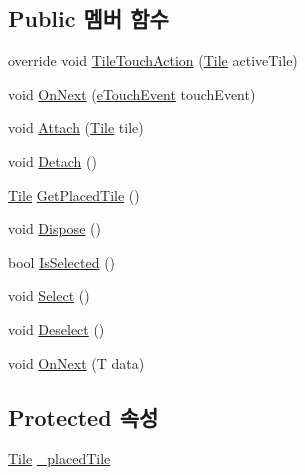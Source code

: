 \subsection*{Public 멤버 함수}
\begin{DoxyCompactItemize}
\item 
override void \hyperlink{class_moveable_object_a8aa14fd4e56b9911e895f5e899e0d9a0}{Tile\+Touch\+Action} (\hyperlink{class_tile}{Tile} active\+Tile)
\item 
void \hyperlink{class_moveable_object_aeba5445de84542260b21e15e1308f712}{On\+Next} (\hyperlink{_touch_manager_8cs_ae33e321a424fe84ba8b2fdb81ad40a68}{e\+Touch\+Event} touch\+Event)
\item 
void \hyperlink{class_placeable_object_a3176ec3d5d26b2a83cdc58b01e630aa1}{Attach} (\hyperlink{class_tile}{Tile} tile)
\item 
void \hyperlink{class_placeable_object_aef2018b58bf7c8c0fab5aaf3d9a154d4}{Detach} ()
\item 
\hyperlink{class_tile}{Tile} \hyperlink{class_placeable_object_ab44a9b122632ac3cf0babb5040e8a201}{Get\+Placed\+Tile} ()
\item 
void \hyperlink{class_placeable_object_a8bd49b7db556556502a0518fc833be48}{Dispose} ()
\item 
bool \hyperlink{class_placeable_object_a71fd42914caa0dc6229fe6a5ffe09b99}{Is\+Selected} ()
\item 
void \hyperlink{class_placeable_object_a019818f3f6c6eb715fed163efa921f5a}{Select} ()
\item 
void \hyperlink{class_placeable_object_a0c1248b1f9981ddbf68e6f70a6498f3d}{Deselect} ()
\item 
void \hyperlink{interface_m_c_n_1_1_i_observer_a2f934b71aa4ddf6f936670d32c3cdff7}{On\+Next} (T data)
\end{DoxyCompactItemize}
\subsection*{Protected 속성}
\begin{DoxyCompactItemize}
\item 
\hyperlink{class_tile}{Tile} \hyperlink{class_placeable_object_a0fd0566f0bb15c71b0630322762342d8}{\+\_\+placed\+Tile}
\end{DoxyCompactItemize}
